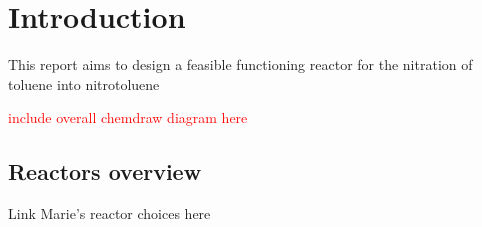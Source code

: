 \section{Introduction}
This report aims to design a feasible functioning reactor for the nitration of toluene into nitrotoluene


\textcolor{red}{include overall chemdraw diagram here}
\subsection{Reactors overview}
Link Marie's reactor choices here


